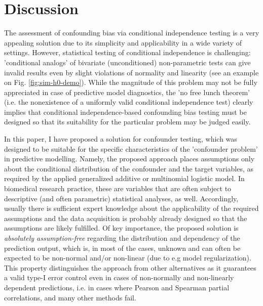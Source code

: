 \documentclass{article}
\begin{document}
\section{Discussion}

The assessment of confounding bias via conditional independence testing is a very appealing solution due to its simplicity and applicability in a wide variety of settings. However, statistical testing of conditional independence is challenging: 'conditional analogs' of bivariate (unconditioned) non-parametric tests can give invalid results even by slight violations of normality and linearity\citep{korn1984ranges} (see an example on Fig. \ref{fig:sim-h0-demo}). While the magnitude of this problem may not be fully appreciated in case of predictive model diagnostics, the 'no free lunch theorem' (i.e. the nonexistence of a uniformly valid conditional independence test)\cite{shah2020hardness} clearly implies that conditional independence-based confounding bias testing must be designed so that its suitability for the particular problem may be judged easily.

In this paper, I have proposed a solution for confounder testing, which was designed to be suitable for the specific characteristics of the 'confounder problem' in predictive modelling. Namely, the proposed approach places assumptions only about the conditional distribution of the confounder and the target variables, as required by the applied generalized additive\cite{hastie1987generalized} or multinomial logistic model\cite{bennett1966multiple, jones1975proability}. In biomedical research practice, these are variables that are often subject to descriptive (and often parametric) statistical analyses, as well. Accordingly, usually there is sufficient expert knowledge about the applicability of the required assumptions and the data acquisition is probably already designed so that the assumptions are likely fulfilled.
Of key importance, the proposed solution is \emph{absolutely assumption-free} regarding the distribution and dependency of the prediction output, which is, in most of the cases, unknown and can often be expected to be non-normal and/or non-linear (due to e.g model regularization)\citep{garcia2009study, kristensen2017whole}. 
This property distinguishes the approach from other alternatives as it guarantees a valid type-I error control even in cases of non-normally and non-linearly dependent predictions, i.e. in cases where Pearson and Spearman partial correlations, and many other methods fail.
\end{document}
